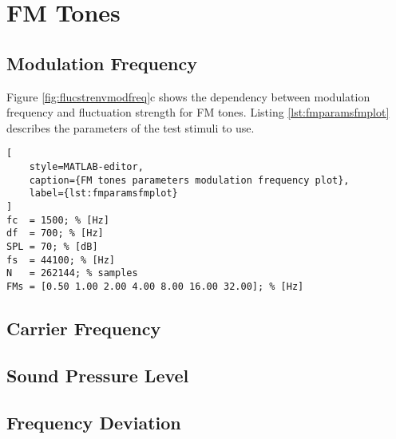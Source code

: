 \documentclass[a4paper]{article}
\begin{document}
\section{FM Tones}

\subsection{Modulation Frequency}

Figure \ref{fig:flucstrenvmodfreq}c shows the dependency between modulation
frequency and fluctuation strength for FM tones. Listing
\ref{lst:fmparamsfmplot} describes the parameters of the test stimuli to use.

\begin{lstlisting}[
    style=MATLAB-editor,
    caption={FM tones parameters modulation frequency plot},
    label={lst:fmparamsfmplot}
]
fc  = 1500; % [Hz]
df  = 700; % [Hz]
SPL = 70; % [dB]
fs  = 44100; % [Hz]
N   = 262144; % samples
FMs = [0.50 1.00 2.00 4.00 8.00 16.00 32.00]; % [Hz]
\end{lstlisting}

\subsection{Carrier Frequency}

\subsection{Sound Pressure Level}

\subsection{Frequency Deviation}

\custombibliography
\end{document}
